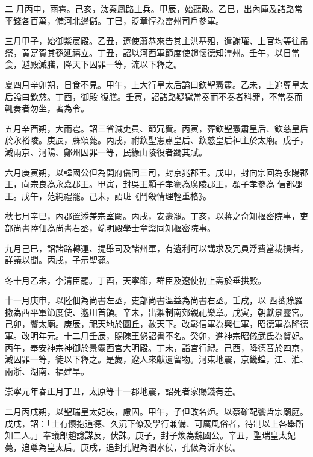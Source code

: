 \begin{pinyinscope}
 二
 月丙申，雨雹。己亥，汰秦鳳路土兵。甲辰，始聽政。乙巳，出內庫及諸路常平錢各百萬，備河北邊儲。丁巳，貶章惇為雷州司戶參軍。



 三月甲子，始御紫宸殿。乙丑，遼使蕭恭來告其主洪基殂，遣謝瓘、上官均等往吊祭，黃寔賀其孫延禧立。丁丑，詔以河西軍節度使趙懷德知湟州。壬午，以日當食，避殿減膳，降天下囚罪一等，流以下釋之。



 夏四月辛卯朔，日食不見。甲午，上大行皇太后謚曰欽聖憲肅。乙未，上追尊皇太后謚曰欽慈。丁酉，御殿
 復膳。壬寅，詔諸路疑獄當奏而不奏者科罪，不當奏而輒奏者勿坐，著為令。



 五月辛酉朔，大雨雹。詔三省減吏員、節冗費。丙寅，葬欽聖憲肅皇后、欽慈皇后於永裕陵。庚辰，蘇頌薨。丙戌，祔欽聖憲肅皇后、欽慈皇后神主於太廟。戊子，減兩京、河陽、鄭州囚罪一等，民緣山陵役者蠲其賦。



 六月庚寅朔，以韓國公但為開府儀同三司，封京兆郡王。戊申，封向宗回為永陽郡王，向宗良為永嘉郡王。甲寅，封吳王顥子孝騫為廣陵郡王，頵子孝參為
 信都郡王。戊午，范純禮罷。己未，詔班《鬥殺情理輕重格》。



 秋七月辛巳，內郡置添差宗室闕。丙戌，安燾罷。丁亥，以蔣之奇知樞密院事，吏部尚書陸佃為尚書右丞，端明殿學士章楶同知樞密院事。



 九月己巳，詔諸路轉運、提舉司及諸州軍，有遺利可以講求及冗員浮費當裁損者，詳議以聞。丙戌，子示聖薨。



 冬十月乙未，李清臣罷。丁酉，天寧節，群臣及遼使初上壽於垂拱殿。



 十一月庚申，以陸佃為尚書左丞，吏部尚書溫益為尚書右丞。壬戌，以
 西蕃賒羅撒為西平軍節度使、邈川首領。辛未，出禦制南郊親祀樂章。戊寅，朝獻景靈宮。己卯，饗太廟。庚辰，祀天地於圜丘，赦天下。改彰信軍為興仁軍，昭德軍為隆德軍。改明年元。十二月壬辰，賜陳王佖詔書不名。癸卯，進神宗昭儀武氏為賢妃。丙午，奉安神宗神御於景靈西宮大明殿。丁未，詣宮行禮。己酉，降德音於四京，減囚罪一等，徒以下釋之。是歲，遼人來獻遺留物。河東地震，京畿蝗，江、淮、兩浙、湖南、福建旱。



 崇寧元年春正月丁丑，太原等十一郡地震，詔死者家賜錢有差。



 二月丙戌朔，以聖瑞皇太妃疾，慮囚。甲午，子但改名烜。以蔡確配饗哲宗廟庭。戊戌，詔：「士有懷抱道德、久沉下僚及學行兼備、可厲風俗者，待制以上各舉所知二人。」奉議郎趙諗謀反，伏誅。庚子，封子煥為魏國公。辛丑，聖瑞皇太妃薨，追尊為皇太后。庚戌，追封孔鯉為泗水侯，孔伋為沂水侯。




\end{pinyinscope}

